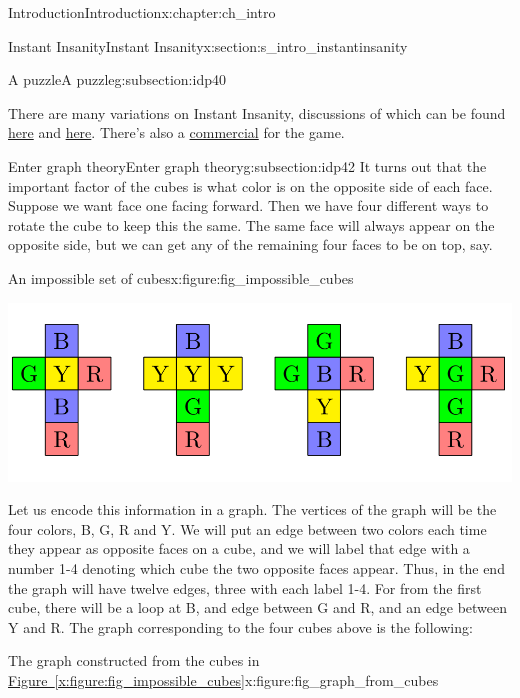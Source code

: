 \documentclass[oneside,10pt,]{book}
\newcommand{\xreffont}{\relax}
\numberwithin{equation}{section}
\begin{document}
\begin{chapterptx}{Introduction}{}{Introduction}{}{}{x:chapter:ch_intro}
\begin{sectionptx}{Instant Insanity}{}{Instant Insanity}{}{}{x:section:s_intro_instantinsanity}
\begin{subsectionptx}{A puzzle}{}{A puzzle}{}{}{g:subsection:idp40}
\par
There are many variations on Instant Insanity, discussions of which can be found \href{http://www.cs.brandeis.edu/\~storer/JimPuzzles/ZPAGES/zzzInstantInsanity.html}{here} and \href{http://www.jaapsch.net/puzzles/insanity.htm}{here}. There’s also a \href{https://www.youtube.com/watch?v=CQ2gHSKZBEw}{commercial} for the game.%
\end{subsectionptx}
%
%
\typeout{************************************************}
\typeout{************************************************}
%
\begin{subsectionptx}{Enter graph theory}{}{Enter graph theory}{}{}{g:subsection:idp42}
It turns out that the important factor of the cubes is what color is on the opposite side of each face.  Suppose we want face one facing forward.  Then we have four different ways to rotate the cube to keep this the same.  The same face will always appear on the opposite side, but we can get any of the remaining four faces to be on top, say.%
\begin{figureptx}{An impossible set of cubes}{x:figure:fig_impossible_cubes}{}%
\begin{image}{0}{1}{0}%
\includegraphics[width=\linewidth]{images/ImpossibleCubes.png}
\end{image}%
\tcblower
\end{figureptx}%
Let us encode this information in a graph.   The vertices of the graph will be the four colors, B, G, R and Y. We will put an edge between two colors each time they appear as opposite faces on a cube, and we will label that edge with a number 1-4 denoting which cube the two opposite faces appear. Thus, in the end the graph will have twelve edges, three with each label 1-4. For from the first cube, there will be a loop at B, and edge between G and R, and an edge between Y and R.  The graph corresponding to the four cubes above is the following:%
\begin{figureptx}{The graph constructed from the cubes in \hyperref[x:figure:fig_impossible_cubes]{Figure~{\xreffont\ref{x:figure:fig_impossible_cubes}}}}{x:figure:fig_graph_from_cubes}{}%

\end{figureptx}
\end{subsectionptx}
\end{sectionptx}
\end{chapterptx}
\end{document}
